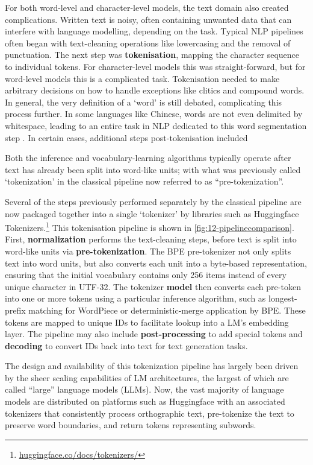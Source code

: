For both word-level and character-level \ngram models, the text domain also created complications. Written text is noisy, often containing unwanted data that can interfere with language modelling, depending on the task. Typical NLP pipelines often began with text-cleaning operations like lowercasing and the removal of punctuation. The next step was \textbf{tokenisation}, mapping the character sequence to individual tokens. For character-level models this was straight-forward, but for word-level models this is a complicated task. Tokenisation needed to make arbitrary decisions on how to handle exceptions like clitics and compound words. In general, the very definition of a `word' is still debated, complicating this process further. In some languages like Chinese, words are not even delimited by whitespace, leading to an entire task in NLP dedicated to this word segmentation step \addcites. In certain cases, additional steps post-tokenisation included 

Both the inference and vocabulary-learning algorithms typically operate after text has already been split into word-like units; with what was previously called `tokenization' in the classical pipeline now referred to as ``pre-tokenization''. 

Several of the steps previously performed separately by the classical pipeline are now packaged together into a single `tokenizer' by libraries such as Huggingface Tokenizers.\footnote{\href{https://huggingface.co/docs/tokenizers/index}{huggingface.co/docs/tokenizers/}} This tokenisation pipeline is shown in \cref{fig:12-pipelinecomparison}. First, \textbf{normalization} performs the text-cleaning steps, before text is split into word-like units via \textbf{pre-tokenization}. The BPE pre-tokenizer not only splits text into word units, but also converts each unit into a byte-based representation, ensuring that the initial vocabulary contains only 256 items instead of every unique character in UTF-32. The tokenizer \textbf{model} then converts each pre-token into one or more tokens using a particular inference algorithm, such as longest-prefix matching for WordPiece or deterministic-merge application by BPE. These tokens are mapped to unique IDs to facilitate lookup into a LM's embedding layer. The pipeline may also include \textbf{post-processing} to add special tokens and \textbf{decoding} to convert IDs back into text for text generation tasks. 

The design and availability of this tokenization pipeline has largely been driven by the sheer scaling capabilities of LM architectures, the largest of which are called ``large'' language models (LLMs). Now, the vast majority of language models are distributed on platforms such as Huggingface with an associated tokenizers that consistently process orthographic text, pre-tokenize the text to preserve word boundaries, and return tokens representing subwords.

